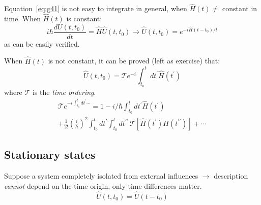 \documentclass[12pt]{article}
\begin{document}
Equation~\eqref{eq:g41} is not easy to integrate in general,
when $\hat{H}(t) \neq$ constant in time.
When $\hat{H}(t)$ is constant:
\begin{equation}
i \hbar \frac{d U\left(t, t_{0}\right)}{d t}=\hat{H} \hat{U}\left(t, t_{0}\right)
\to
\hat{U}\left(t, t_{0}\right)=e^{-i \hat{H}\left(t-t_{0}\right) / t}
\label{eq:g44}
\end{equation}
as can be easily verified.

When $\hat{H}(t)$ is not constant, it can be proved (left as exercise) that:
\begin{equation}
\hat{U}\left(t, t_{0}\right)=\mathcal{T} e^{-i} \int_{t_{0}}^{t} d t^{\prime} \hat{H}\left(t^{\prime}\right)
\end{equation} 
where $\mathcal{T}$ is the \emph{time ordering}.
\begin{equation}
\begin{gathered}
\mathcal{T} e^{-i \int_{t_{0}}^{t} d t^{\prime} \cdots} = 1 
-i / \hbar \int_{t_{0}}^{t} dt^{\prime} \hat{H}\left(t^{\prime}\right)\\
+
\frac{1}{2 !}\left(\frac{i}{\hbar}\right)^{2} \int_{t_{0}}^{t} d t^{\prime} \int_{t_{0}}^{t} d t^{\prime \prime} \, \mathcal{T}\left[\hat{H}\left(t^{\prime}\right) H\left(t^{\prime \prime}\right)\right]+\cdots
\end{gathered}
\end{equation}

\subsection{Stationary states}

Suppose a system completely isolated from 
external influences $\to$ description \emph{cannot} depend
on the time origin, only time differences matter.
\begin{equation}
\hat{U}\left(t, t_{0}\right)=\hat{U}\left(t-t_{0}\right)
\end{equation}

\end{document}
